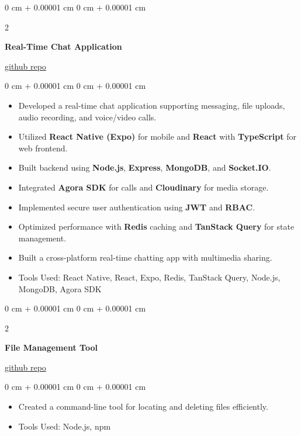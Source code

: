 \documentclass[10pt, letterpaper]{article}
\newenvironment{highlights}{
    \begin{itemize}[
        topsep=0.10 cm,
        parsep=0.10 cm,
        partopsep=0pt,
        itemsep=0pt,
        leftmargin=0 cm + 10pt
    ]
}{
    \end{itemize}
} %
\newenvironment{onecolentry}{
    \begin{adjustwidth}{
        0 cm + 0.00001 cm
    }{
        0 cm + 0.00001 cm
    }
}{
    \end{adjustwidth}
} %
\newenvironment{twocolentry}[2][]{
    \onecolentry
    \def\secondColumn{#2}
    \setcolumnwidth{\fill, 4.5 cm}
    \begin{paracol}{2}
}{
    \switchcolumn \raggedleft \secondColumn
    \end{paracol}
    \endonecolentry
} %
\begin{document}
\begin{twocolentry}{\href{https://github.com/murvyn/chat-forum}{github repo}}
    \textbf{Real-Time Chat Application}
\end{twocolentry}
\vspace{0.10 cm}
\begin{onecolentry}
    \begin{highlights}
        \item Developed a real-time chat application supporting messaging, file uploads,
        audio recording, and voice/video calls.
        \item Utilized \textbf{React Native (Expo)} for mobile and \textbf{React} with
        \textbf{TypeScript} for web frontend.
        \item Built backend using \textbf{Node.js}, \textbf{Express}, \textbf{MongoDB}, and
        \textbf{Socket.IO}.
        \item Integrated \textbf{Agora SDK} for calls and \textbf{Cloudinary} for media
        storage.
        \item Implemented secure user authentication using \textbf{JWT} and \textbf{RBAC}.
        \item Optimized performance with \textbf{Redis} caching and \textbf{TanStack Query}
        for state management.
        \item Built a cross-platform real-time chatting app with multimedia sharing.
        \item Tools Used: React Native, React, Expo, Redis, TanStack Query, Node.js, MongoDB,
        Agora SDK
    \end{highlights}
\end{onecolentry}

\vspace{0.2 cm}

\begin{twocolentry}{\href{https://github.com/murvyn/delete-file-cli}{github repo}}
    \textbf{File Management Tool}
\end{twocolentry}
\vspace{0.10 cm}
\begin{onecolentry}
    \begin{highlights}
        \item Created a command-line tool for locating and deleting files efficiently.
        \item Tools Used: Node.js, npm
    \end{highlights}
\end{onecolentry}
\end{document}
